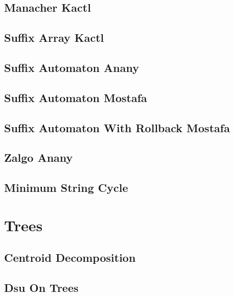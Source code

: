 \subsection{Manacher Kactl}
\raggedbottom
\hrulefill
\subsection{Suffix Array Kactl}
\raggedbottom
\hrulefill
\subsection{Suffix Automaton Anany}
\raggedbottom
\hrulefill
\subsection{Suffix Automaton Mostafa}
\raggedbottom
\hrulefill
\subsection{Suffix Automaton With Rollback Mostafa}
\raggedbottom
\hrulefill
\subsection{Zalgo Anany}
\raggedbottom
\hrulefill
\subsection{Minimum String Cycle}
\raggedbottom
\hrulefill

\section{Trees}
\subsection{Centroid Decomposition}
\raggedbottom
\hrulefill
\subsection{Dsu On Trees}
\raggedbottom
\hrulefill
